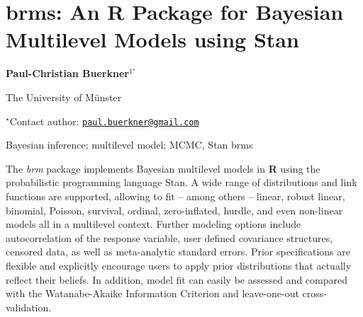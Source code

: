 \documentclass[\main/boa.tex]{subfiles}
\begin{document}
\pagestyle{empty}

\section{brms: An R Package for Bayesian Multilevel Models using Stan}

\begin{center}
  {\bf Paul-Christian Buerkner$^{1^\star}$}
\end{center}

\vskip 0.3cm

\begin{affiliations}
\begin{enumerate}
\begin{minipage}{0.915\textwidth}
\centering
\item The University of Münster \\[-2pt]
\end{minipage}
\end{enumerate}
$^\star$Contact author: \href{mailto:paul.buerkner@gmail.com}{\nolinkurl{paul.buerkner@gmail.com}}\\
\end{affiliations}

\vskip 0.5cm

\begin{minipage}{0.915\textwidth}
\keywords Bayesian inference; multilevel model; MCMC, Stan
\packages brms
\end{minipage}

\vskip 0.8cm

The \emph{brm} package implements Bayesian multilevel models in
\textbf{R} using the probabilistic programming language Stan. A wide
range of distributions and link functions are supported, allowing to fit
-- among others -- linear, robust linear, binomial, Poisson, survival,
ordinal, zero-inflated, hurdle, and even non-linear models all in a
multilevel context. Further modeling options include autocorrelation of
the response variable, user defined covariance structures, censored
data, as well as meta-analytic standard errors. Prior specifications are
flexible and explicitly encourage users to apply prior distributions
that actually reflect their beliefs. In addition, model fit can easily
be assessed and compared with the Watanabe-Akaike Information Criterion
and leave-one-out cross-validation.
\end{document}
